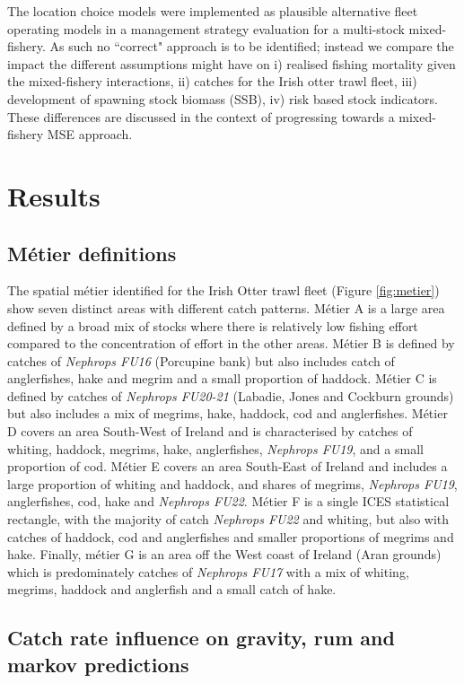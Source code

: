 \documentclass[12pt, halfline, a4paper]{ouparticle}
\begin{document}
The location choice models were implemented as plausible alternative fleet
operating models in a management strategy evaluation for a multi-stock
mixed-fishery. As such no ``correct" approach is to be identified; instead we
compare the impact the different assumptions might have on i) realised fishing
mortality given the mixed-fishery interactions, ii) catches for the Irish otter
trawl fleet, iii) development of spawning stock biomass (SSB), iv) risk based
stock indicators. These differences are discussed in the context of progressing
towards a mixed-fishery MSE approach.

\section{Results}
\label{res}

\subsection{Métier definitions}

The spatial métier identified for the Irish Otter trawl fleet (Figure
\ref{fig:metier}) show seven distinct areas with different catch patterns.
Métier A is a large area defined by a broad mix of stocks where there is
relatively low fishing effort compared to the concentration of effort in the
other areas. Métier B is defined by catches of \textit{Nephrops FU16}
(Porcupine bank) but also includes catch of anglerfishes, hake and megrim and a
small proportion of haddock. Métier C is defined by catches of \textit{Nephrops
	FU20-21} (Labadie, Jones and Cockburn grounds) but also includes a mix
of megrims, hake, haddock, cod and anglerfishes. Métier D covers an area
South-West of Ireland and is characterised by catches of whiting, haddock,
megrims, hake, anglerfishes, \textit{Nephrops FU19}, and a small proportion of
cod. Métier E covers an area South-East of Ireland and includes a large
proportion of whiting and haddock, and shares of megrims, \textit{Nephrops
	FU19}, anglerfishes, cod, hake and \textit{Nephrops FU22}.  Métier F is
a single ICES statistical rectangle, with the majority of catch
\textit{Nephrops FU22} and whiting, but also with catches of haddock, cod and
anglerfishes and smaller proportions of megrims and hake. Finally, métier G is
an area off the West coast of Ireland (Aran grounds) which is predominately
catches of \textit{Nephrops FU17} with a mix of whiting, megrims, haddock and
anglerfish and a small catch of hake.

\subsection{Catch rate influence on gravity, rum and markov predictions}
\end{document}
